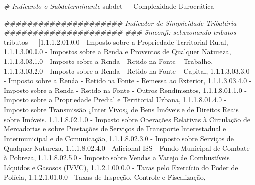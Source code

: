\documentclass[
  12,
  dvipsnames]{article}
\newenvironment{Shaded}{\begin{snugshade}}{\end{snugshade}}
\newcommand{\CommentTok}[1]{\textcolor[rgb]{0.56,0.35,0.01}{\textit{#1}}}
\newcommand{\NormalTok}[1]{#1}
\newcommand{\OperatorTok}[1]{\textcolor[rgb]{0.81,0.36,0.00}{\textbf{#1}}}
\newcommand{\StringTok}[1]{\textcolor[rgb]{0.31,0.60,0.02}{#1}}
\begin{document}
\begin{Shaded}
\begin{Highlighting}[]
\CommentTok{\# Indicando o Subdeterminante}
\NormalTok{subdet }\OperatorTok{=} \StringTok{\textquotesingle{}Complexidade Burocrática\textquotesingle{}}

\CommentTok{\#\#\#\#\#\#\#\#\#\#\#\#\#\#\#\#\#\#\#\#\# Indicador de Simplicidade Tributária \#\#\#\#\#\#\#\#\#\#\#\#\#\#\#\#\#\#\#\#\#}
\CommentTok{\#\#\# Sinconfi: selecionando tributos}
\NormalTok{tributos }\OperatorTok{=}\NormalTok{ [}\StringTok{\textquotesingle{}1.1.1.2.01.0.0 {-} Imposto sobre a Propriedade Territorial Rural\textquotesingle{}}\NormalTok{, }
            \StringTok{\textquotesingle{}1.1.1.3.00.0.0 {-} Impostos sobre a Renda e Proventos de Qualquer Natureza\textquotesingle{}}\NormalTok{,}
            \StringTok{\textquotesingle{}1.1.1.3.03.1.0 {-} Imposto sobre a Renda {-} Retido na Fonte – Trabalho\textquotesingle{}}\NormalTok{,}
            \StringTok{\textquotesingle{}1.1.1.3.03.2.0 {-} Imposto sobre a Renda {-} Retido na Fonte – Capital\textquotesingle{}}\NormalTok{,}
            \StringTok{\textquotesingle{}1.1.1.3.03.3.0 {-} Imposto sobre a Renda {-} Retido na Fonte {-} Remessa ao Exterior\textquotesingle{}}\NormalTok{,}
            \StringTok{\textquotesingle{}1.1.1.3.03.4.0 {-} Imposto sobre a Renda {-} Retido na Fonte {-} Outros Rendimentos\textquotesingle{}}\NormalTok{,}
            \StringTok{\textquotesingle{}1.1.1.8.01.1.0 {-} Imposto sobre a Propriedade Predial e Territorial Urbana\textquotesingle{}}\NormalTok{,}
            \StringTok{\textquotesingle{}1.1.1.8.01.4.0 {-} Imposto sobre Transmissão ¿Inter Vivos¿ de Bens Imóveis e de Direitos Reais sobre Imóveis\textquotesingle{}}\NormalTok{,}
            \StringTok{\textquotesingle{}1.1.1.8.02.1.0 {-} Imposto sobre Operações Relativas à Circulação de Mercadorias e sobre Prestações de Serviços de Transporte Interestadual e Intermunicipal e de Comunicação\textquotesingle{}}\NormalTok{,}
            \StringTok{\textquotesingle{}1.1.1.8.02.3.0 {-} Imposto sobre Serviços de Qualquer Natureza\textquotesingle{}}\NormalTok{,}
            \StringTok{\textquotesingle{}1.1.1.8.02.4.0 {-} Adicional ISS {-} Fundo Municipal de Combate à Pobreza\textquotesingle{}}\NormalTok{,}
            \StringTok{\textquotesingle{}1.1.1.8.02.5.0 {-} Imposto sobre Vendas a Varejo de Combustíveis Líquidos e Gasosos (IVVC)\textquotesingle{}}\NormalTok{,}
            \StringTok{\textquotesingle{}1.1.2.1.00.0.0 {-} Taxas pelo Exercício do Poder de Polícia\textquotesingle{}}\NormalTok{,}
            \StringTok{\textquotesingle{}1.1.2.1.01.0.0 {-} Taxas de Inspeção, Controle e Fiscalização\textquotesingle{}}\NormalTok{,}

\end{Highlighting}
\end{Shaded}
\end{document}
